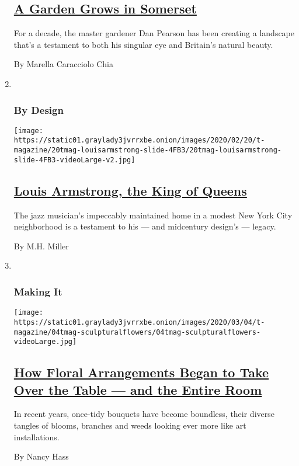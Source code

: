 \begin{enumerate}
  \hypertarget{a-garden-grows-in-somerset}{%
  \subsection{\texorpdfstring{\href{/2020/03/12/t-magazine/master-gardener-dan-pearson.html}{A
  Garden Grows in
  Somerset}}{A Garden Grows in Somerset}}\label{a-garden-grows-in-somerset}}

  For a decade, the master gardener Dan Pearson has been creating a
  landscape that's a testament to both his singular eye and Britain's
  natural beauty.

  By Marella Caracciolo Chia
\item ~
  \hypertarget{by-design}{%
  \subsubsection{By Design}\label{by-design}}

  \texttt{[image: https://static01.graylady3jvrrxbe.onion/images/2020/02/20/t-magazine/20tmag-louisarmstrong-slide-4FB3/20tmag-louisarmstrong-slide-4FB3-videoLarge-v2.jpg]}

  \hypertarget{louis-armstrong-the-king-of-queens}{%
  \subsection{\texorpdfstring{\href{/2020/02/20/t-magazine/louis-armstrong-home-queens.html}{Louis
  Armstrong, the King of
  Queens}}{Louis Armstrong, the King of Queens}}\label{louis-armstrong-the-king-of-queens}}

  The jazz musician's impeccably maintained home in a modest New York
  City neighborhood is a testament to his --- and midcentury design's
  --- legacy.

  By M.H. Miller
\item ~
  \hypertarget{making-it}{%
  \subsubsection{Making It}\label{making-it}}

  \texttt{[image: https://static01.graylady3jvrrxbe.onion/images/2020/03/04/t-magazine/04tmag-sculpturalflowers/04tmag-sculpturalflowers-videoLarge.jpg]}

  \hypertarget{how-floral-arrangements-began-to-take-over-the-table--and-the-entire-room}{%
  \subsection{\texorpdfstring{\href{/2020/03/04/t-magazine/flower-arrangements-sculptures.html}{How
  Floral Arrangements Began to Take Over the Table --- and the Entire
  Room}}{How Floral Arrangements Began to Take Over the Table --- and the Entire Room}}\label{how-floral-arrangements-began-to-take-over-the-table--and-the-entire-room}}

  In recent years, once-tidy bouquets have become boundless, their
  diverse tangles of blooms, branches and weeds looking ever more like
  art installations.

  By Nancy Hass
\end{enumerate}

